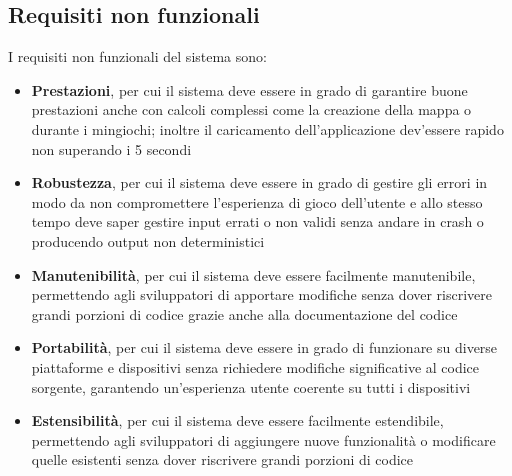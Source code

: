 \subsection{Requisiti non funzionali} \label{subsec:non_functional_requirements}
I requisiti non funzionali del sistema sono:
\begin{itemize}
    \item \textbf{Prestazioni}, per cui il sistema deve essere in grado di garantire buone prestazioni anche con calcoli complessi
    come la creazione della mappa o durante i mingiochi; inoltre il caricamento dell'applicazione dev'essere rapido non superando 
    i 5 secondi
    \item \textbf{Robustezza}, per cui il sistema deve essere in grado di gestire gli errori in modo da non compromettere
    l'esperienza di gioco dell'utente e allo stesso tempo deve saper gestire input errati o non validi senza andare in crash
    o producendo output non deterministici
    \item \textbf{Manutenibilità}, per cui il sistema deve essere facilmente manutenibile, permettendo agli sviluppatori
    di apportare modifiche senza dover riscrivere grandi porzioni di codice grazie anche alla documentazione del codice
    \item \textbf{Portabilità}, per cui il sistema deve essere in grado di funzionare su diverse piattaforme e dispositivi senza richiedere
    modifiche significative al codice sorgente, garantendo un'esperienza utente coerente su tutti i dispositivi
    \item \textbf{Estensibilità}, per cui il sistema deve essere facilmente estendibile, permettendo agli sviluppatori di aggiungere
    nuove funzionalità o modificare quelle esistenti senza dover riscrivere grandi porzioni di codice
\end{itemize}